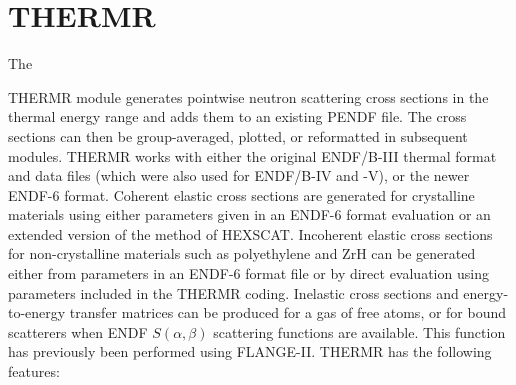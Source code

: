 \section{THERMR}
\label{sTHERMR}

\hypertarget{sTHERMRhy}{The}
THERMR module generates pointwise neutron
scattering cross sections in the thermal energy range
 and adds them to an existing
PENDF file.  The cross sections can then be
group-averaged, plotted, or reformatted in subsequent modules.
THERMR works with either the original ENDF/B-III thermal
format\cite{old102} and data files\cite{GAreport} (which were
also used for ENDF/B-IV and -V), or the newer ENDF-6
format\cite{ENDF102}.  Coherent elastic
cross sections are generated for crystalline materials using
either parameters given in an ENDF-6 format evaluation or an extended
version of the method of HEXSCAT\cite{HEXSCAT}.
Incoherent elastic cross sections
for non-crystalline materials such as polyethylene and ZrH
can be generated either from parameters in an ENDF-6 format file or by
direct evaluation using parameters included in the THERMR coding.
Inelastic cross sections and
energy-to-energy transfer matrices can be produced for a gas
of free atoms, or for bound scatterers when ENDF
$S(\alpha,\beta)$ scattering functions
are available.  This function has previously been performed
using FLANGE-II\cite{FLANGE}.  THERMR has the
following features:


